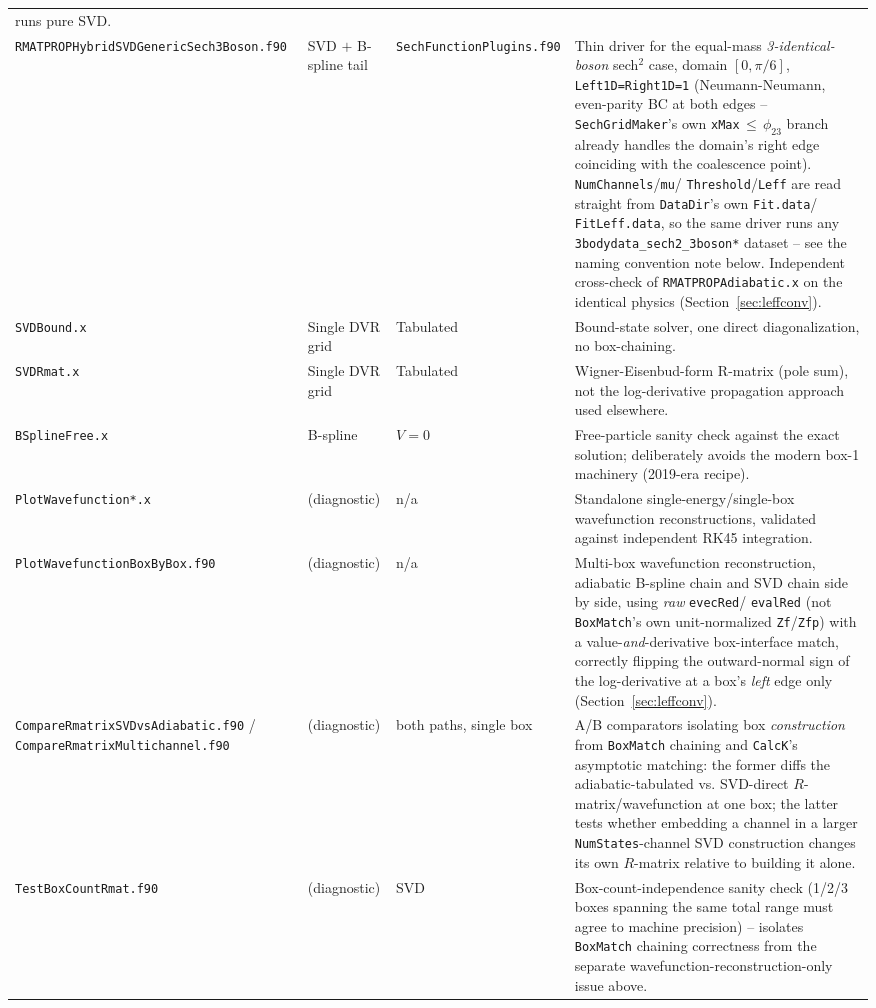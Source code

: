 \documentclass[11pt]{article}
\newcommand{\file}[1]{\texttt{#1}}
\newcommand{\sub}[1]{\texttt{#1}}
\begin{document}
{\begin{longtable}{@{}p{3.3cm}p{2cm}p{3cm}p{7cm}@{}}
  runs pure SVD. \\
\file{RMATPROPHybridSVDGenericSech3Boson.f90} & SVD $+$ B-spline tail & \file{SechFunctionPlugins.f90} & Thin
  driver for the equal-mass \emph{3-identical-boson} sech$^2$ case, domain $[0,\pi/6]$,
  \texttt{Left1D=Right1D=1} (Neumann-Neumann, even-parity BC at both edges --
  \sub{SechGridMaker}'s own \texttt{xMax}$\,\le\,\phi_{23}$ branch already handles the domain's
  right edge coinciding with the coalescence point). \texttt{NumChannels}/\texttt{mu}/
  \texttt{Threshold}/\texttt{Leff} are read straight from \texttt{DataDir}'s own \texttt{Fit.data}/
  \texttt{FitLeff.data}, so the same driver runs any \texttt{3bodydata\_sech2\_3boson*} dataset --
  see the naming convention note below. Independent cross-check of \file{RMATPROPAdiabatic.x} on
  the identical physics (Section~\ref{sec:leffconv}). \\
\file{SVDBound.x} & Single DVR grid & Tabulated & Bound-state solver, one direct diagonalization,
  no box-chaining. \\
\file{SVDRmat.x} & Single DVR grid & Tabulated & Wigner-Eisenbud-form R-matrix (pole sum), not the
  log-derivative propagation approach used elsewhere. \\
\file{BSplineFree.x} & B-spline & $V=0$ & Free-particle sanity check against the exact solution;
  deliberately avoids the modern box-1 machinery (2019-era recipe). \\
\file{PlotWavefunction*.x} & (diagnostic) & n/a & Standalone single-energy/single-box wavefunction
  reconstructions, validated against independent RK45 integration. \\
\file{PlotWavefunctionBoxByBox.f90} & (diagnostic) & n/a & Multi-box wavefunction reconstruction,
  adiabatic B-spline chain and SVD chain side by side, using \emph{raw} \texttt{evecRed}/
  \texttt{evalRed} (not \sub{BoxMatch}'s own unit-normalized \texttt{Zf}/\texttt{Zfp}) with a
  value-\emph{and}-derivative box-interface match, correctly flipping the outward-normal sign of
  the log-derivative at a box's \emph{left} edge only (Section~\ref{sec:leffconv}). \\
\file{CompareRmatrixSVDvsAdiabatic.f90} / \file{CompareRmatrixMultichannel.f90} & (diagnostic) &
  both paths, single box & A/B comparators isolating box \emph{construction} from \sub{BoxMatch}
  chaining and \sub{CalcK}'s asymptotic matching: the former diffs the adiabatic-tabulated vs.
  SVD-direct $R$-matrix/wavefunction at one box; the latter tests whether embedding a channel in a
  larger \texttt{NumStates}-channel SVD construction changes its own $R$-matrix relative to
  building it alone. \\
\file{TestBoxCountRmat.f90} & (diagnostic) & SVD & Box-count-independence sanity check (1/2/3 boxes
  spanning the same total range must agree to machine precision) -- isolates \sub{BoxMatch}
  chaining correctness from the separate wavefunction-reconstruction-only issue above. \\
\bottomrule
\end{longtable}}
\end{document}
